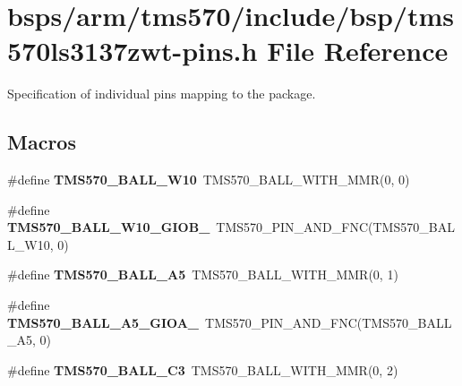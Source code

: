 \hypertarget{tms570ls3137zwt-pins_8h}{}\section{bsps/arm/tms570/include/bsp/tms570ls3137zwt-\/pins.h File Reference}
\label{tms570ls3137zwt-pins_8h}


Specification of individual pins mapping to the package.  


\subsection*{Macros}
\begin{DoxyCompactItemize}
\item 
\mbox{\label{tms570ls3137zwt-pins_8h_af3fe649bd55fff8ad237671e7b23c7ab}} 
\#define {\bfseries T\+M\+S570\+\_\+\+B\+A\+L\+L\+\_\+\+W10}~T\+M\+S570\+\_\+\+B\+A\+L\+L\+\_\+\+W\+I\+T\+H\+\_\+\+M\+MR(0, 0)
\item 
\mbox{\label{tms570ls3137zwt-pins_8h_afe2d97b24627c42c67775eb4ccb38a56}} 
\#define {\bfseries T\+M\+S570\+\_\+\+B\+A\+L\+L\+\_\+\+W10\+\_\+\+G\+I\+O\+B\+\_}~T\+M\+S570\+\_\+\+P\+I\+N\+\_\+\+A\+N\+D\+\_\+\+F\+NC(T\+M\+S570\+\_\+\+B\+A\+L\+L\+\_\+\+W10, 0)
\item 
\mbox{\label{tms570ls3137zwt-pins_8h_ae86138a9b2d893dcbf7b99823fb4a892}} 
\#define {\bfseries T\+M\+S570\+\_\+\+B\+A\+L\+L\+\_\+\+A5}~T\+M\+S570\+\_\+\+B\+A\+L\+L\+\_\+\+W\+I\+T\+H\+\_\+\+M\+MR(0, 1)
\item 
\mbox{\label{tms570ls3137zwt-pins_8h_a8080b38305ebd1523f00de74f81bcd74}} 
\#define {\bfseries T\+M\+S570\+\_\+\+B\+A\+L\+L\+\_\+\+A5\+\_\+\+G\+I\+O\+A\+\_}~T\+M\+S570\+\_\+\+P\+I\+N\+\_\+\+A\+N\+D\+\_\+\+F\+NC(T\+M\+S570\+\_\+\+B\+A\+L\+L\+\_\+\+A5, 0)
\item 
\mbox{\label{tms570ls3137zwt-pins_8h_a68948ca9f3c53538b8cfc25cfa0f0e82}} 
\#define {\bfseries T\+M\+S570\+\_\+\+B\+A\+L\+L\+\_\+\+C3}~T\+M\+S570\+\_\+\+B\+A\+L\+L\+\_\+\+W\+I\+T\+H\+\_\+\+M\+MR(0, 2)
\item 
\mbox{\label{tms570ls3137zwt-pins_8h_ae1d5faec7b384610b369792246db0a12}} 

\end{DoxyCompactItemize}
